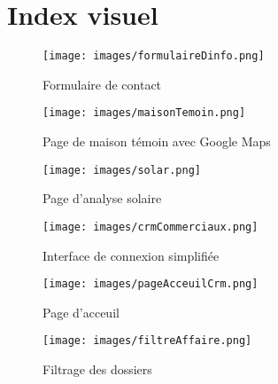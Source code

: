 \section*{Index visuel}

\begin{figure}[H]
    \begin{minipage}[t]{0.6\textwidth}
        \centering
        \texttt{[image: images/formulaireDinfo.png]}
    \end{minipage}
    \begin{minipage}[t]{0.6\textwidth}
        \caption*{Formulaire de contact}
    \end{minipage}
    \vspace{1em}
    \begin{minipage}[t]{0.6\textwidth}
        \centering
        \texttt{[image: images/maisonTemoin.png]}
    \end{minipage}
    \begin{minipage}[t]{0.6\textwidth}
        \caption*{Page de maison témoin avec Google Maps} %
    \end{minipage}
    \vspace{1em}
    \begin{minipage}[t]{0.6\textwidth}
        \centering
        \texttt{[image: images/solar.png]}
    \end{minipage}
    \begin{minipage}[t]{0.6\textwidth}
        \caption*{Page d’analyse solaire}
    \end{minipage}
\end{figure}
\newpage

\begin{figure}[H]
    \begin{minipage}[t]{0.6\textwidth}
        \centering
        \texttt{[image: images/crmCommerciaux.png]}
    \end{minipage}
    \begin{minipage}[t]{0.6\textwidth}
        \caption*{Interface de connexion simplifiée}
    \end{minipage}
    \vspace{1em}
    \begin{minipage}[t]{0.6\textwidth}
        \centering
        \texttt{[image: images/pageAcceuilCrm.png]}
    \end{minipage}
    \begin{minipage}[t]{0.6\textwidth}
        \caption*{Page d'acceuil}
    \end{minipage}
    \vspace{1em}
    \begin{minipage}[t]{0.6\textwidth}
        \centering
        \texttt{[image: images/filtreAffaire.png]}
    \end{minipage}
    \begin{minipage}[t]{0.6\textwidth}
        \caption*{Filtrage des dossiers}
    \end{minipage}
\end{figure}
\newpage

